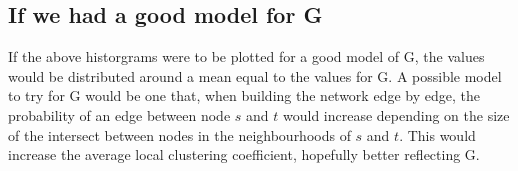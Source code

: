\documentclass[]{article}
\begin{document}
\subsection{If we had a good model for
G}\label{if-we-had-a-good-model-for-g}

If the above historgrams were to be plotted for a good model of G, the
values would be distributed around a mean equal to the values for G. A
possible model to try for G would be one that, when building the network
edge by edge, the probability of an edge between node \(s\) and \(t\)
would increase depending on the size of the intersect between nodes in
the neighbourhoods of \(s\) and \(t\). This would increase the average
local clustering coefficient, hopefully better reflecting G.
\end{document}
